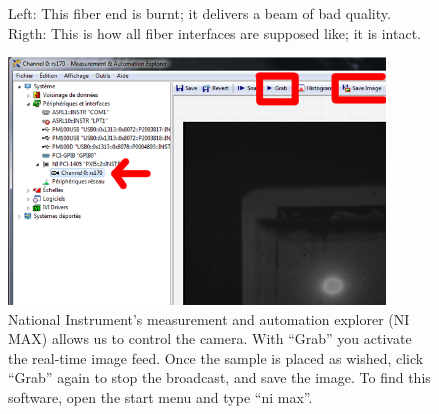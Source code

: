 \begin{figure}
\centering
{}
\caption{Left: This fiber end is burnt; it delivers a beam of bad quality.
Rigth: This is how all fiber interfaces are supposed like; it is intact.}
\label{img:burnt}
\end{figure}

\begin{figure}
\centering
\includegraphics[width=10cm]{img/ni-max.png}
\caption{National Instrument's measurement and automation explorer
(NI MAX) allows us to control the camera.
With ``Grab'' you activate the real-time image feed.
Once the sample is placed as wished, click ``Grab'' again
to stop the broadcast,
and save the image.
To find this software, open the start menu and type ``ni max''.}
\label{img:ni_max}
\end{figure}



